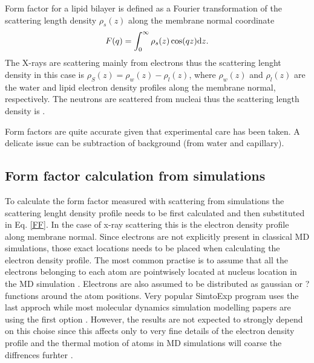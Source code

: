\documentclass[aps,prl,superscriptaddress,twocolumn]{revtex4}
\begin{document}
Form factor for a lipid bilayer is defined as a Fourier transformation of the scattering length density
$\rho_s(z)$ along the membrane normal coordinate
\begin{equation}\label{FF}
F(q)=\int_0^\infty \rho_s(z) \cos(qz) {\rm d}z.
\end{equation}
The X-rays are scattering mainly from electrons thus the scattering lenght density in this
case is $\rho_S(z)=\rho_w(z)-\rho_l(z)$, where $\rho_w(z)$ and $\rho_l(z)$ are the water and lipid 
electron density profiles along the membrane normal, respectively. The neutrons are scattered from nucleai thus
the scattering length density is .

Form factors are quite accurate given that experimental care has been taken. A delicate issue 
can be subtraction of background (from water and capillary). 


\subsection{Form factor calculation from simulations}
To calculate the form factor measured with scattering from simulations the
scattering lenght density profile needs to be first calculated and then substituted in Eq. \ref{FF}.
In the case of x-ray scattering this is the electron density profile along membrane normal.
Since electrons are not explicitly present in classical MD simulations, those exact locations
needs to be placed when calculating the electron density profile. The most common practise
is to assume that all the electrons belonging to each atom are pointwisely located at nucleus location
in the MD simulation \cite{??}. Electrons are also assumed to be distributed as gaussian \cite{??} or ? functions \cite{??}
around the atom positions. Very popular SimtoExp program uses the last approch \cite{??} while most 
molecular dynamics simulation modelling papers are using the first option \cite{??}. However,
the results are not expected to strongly depend on this choise since this affects only to very
fine details of the electron density profile and the thermal motion of atoms in MD simulations
will coarse the diffrences furhter \cite{??}.
\end{document}
